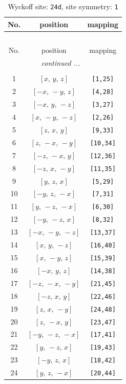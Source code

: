 \documentclass[fleqn,8pt]{jsarticle}
\begin{document}
\begin{longtable}{ccc}
\caption{Wyckoff site: {\tt 24d}, site symmetry: {\tt 1}}
 \\
 \hline \hline
No. & position & mapping \\ \hline \endfirsthead

\multicolumn{2}{l}{\tablename\ \thetable{}} \\
 \hline \hline
No. & position & mapping \\ \hline \endhead

 \hline \hline
\multicolumn{2}{r}{\footnotesize\it continued ...} \\ \endfoot

 \hline \hline
\multicolumn{2}{r}{} \\ \endlastfoot

1 & $\left[ x,\, y,\, z \right]$ & {\tt [1,25]} \\ \hline
2 & $\left[ - x,\, - y,\, z \right]$ & {\tt [4,28]} \\ \hline
3 & $\left[ - x,\, y,\, - z \right]$ & {\tt [3,27]} \\ \hline
4 & $\left[ x,\, - y,\, - z \right]$ & {\tt [2,26]} \\ \hline
5 & $\left[ z,\, x,\, y \right]$ & {\tt [9,33]} \\ \hline
6 & $\left[ z,\, - x,\, - y \right]$ & {\tt [10,34]} \\ \hline
7 & $\left[ - z,\, - x,\, y \right]$ & {\tt [12,36]} \\ \hline
8 & $\left[ - z,\, x,\, - y \right]$ & {\tt [11,35]} \\ \hline
9 & $\left[ y,\, z,\, x \right]$ & {\tt [5,29]} \\ \hline
10 & $\left[ - y,\, z,\, - x \right]$ & {\tt [7,31]} \\ \hline
11 & $\left[ y,\, - z,\, - x \right]$ & {\tt [6,30]} \\ \hline
12 & $\left[ - y,\, - z,\, x \right]$ & {\tt [8,32]} \\ \hline
13 & $\left[ - x,\, - y,\, - z \right]$ & {\tt [13,37]} \\ \hline
14 & $\left[ x,\, y,\, - z \right]$ & {\tt [16,40]} \\ \hline
15 & $\left[ x,\, - y,\, z \right]$ & {\tt [15,39]} \\ \hline
16 & $\left[ - x,\, y,\, z \right]$ & {\tt [14,38]} \\ \hline
17 & $\left[ - z,\, - x,\, - y \right]$ & {\tt [21,45]} \\ \hline
18 & $\left[ - z,\, x,\, y \right]$ & {\tt [22,46]} \\ \hline
19 & $\left[ z,\, x,\, - y \right]$ & {\tt [24,48]} \\ \hline
20 & $\left[ z,\, - x,\, y \right]$ & {\tt [23,47]} \\ \hline
21 & $\left[ - y,\, - z,\, - x \right]$ & {\tt [17,41]} \\ \hline
22 & $\left[ y,\, - z,\, x \right]$ & {\tt [19,43]} \\ \hline
23 & $\left[ - y,\, z,\, x \right]$ & {\tt [18,42]} \\ \hline
24 & $\left[ y,\, z,\, - x \right]$ & {\tt [20,44]} \\
\end{longtable}
\end{document}
